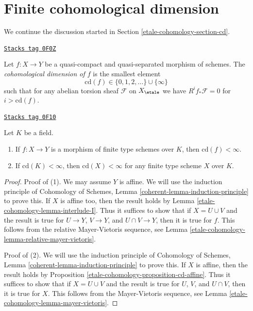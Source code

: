 \section{Finite cohomological dimension}
\label{etale-cohomology-section-finite-cd}
We continue the discussion started in Section \ref{etale-cohomology-section-cd}.

\begin{definition}[Cd f]
\label{etale-cohomology-definition-cd-f}
\href{https://stacks.math.columbia.edu/tag/0F0Z}{\texttt{Stacks tag 0F0Z}}

Let $f : X \to Y$ be a quasi-compact and quasi-separated
morphism of schemes.
The {\it cohomological dimension of $f$} is the smallest
element
$$
\text{cd}(f) \in \{0, 1, 2, \ldots\} \cup \{\infty\}
$$
such that for any abelian torsion sheaf $\mathcal{F}$
on $X_\etale$ we have $R^if_*\mathcal{F} = 0$
for $i > \text{cd}(f)$.
\end{definition}

\begin{lemma}[Finite cd]
\label{etale-cohomology-lemma-finite-cd}
\href{https://stacks.math.columbia.edu/tag/0F10}{\texttt{Stacks tag 0F10}}

Let $K$ be a field.
\begin{enumerate}
\item If $f : X \to Y$ is a morphism of finite type schemes over $K$,
then $\text{cd}(f) < \infty$.
\item If $\text{cd}(K) < \infty$, then $\text{cd}(X) < \infty$
for any finite type scheme $X$ over $K$.
\end{enumerate}
\end{lemma}

\begin{proof}
Proof of (1). We may assume $Y$ is affine. We will use the
induction principle of
Cohomology of Schemes, Lemma \ref{coherent-lemma-induction-principle}
to prove this. If $X$ is affine too, then the result holds by
Lemma \ref{etale-cohomology-lemma-interlude-I}. Thus it suffices to show that if
$X = U \cup V$ and the result is true for $U \to Y$, $V \to Y$, and
$U \cap V \to Y$, then it is true for $f$. This follows from the
relative Mayer-Vietoris sequence, see
Lemma \ref{etale-cohomology-lemma-relative-mayer-vietoris}.

\medskip\noindent
Proof of (2). We will use the induction principle of
Cohomology of Schemes, Lemma \ref{coherent-lemma-induction-principle}
to prove this. If $X$ is affine, then the result holds by
Proposition \ref{etale-cohomology-proposition-cd-affine}. Thus it suffices to show that if
$X = U \cup V$ and the result is true for $U$, $V$, and
$U \cap V $, then it is true for $X$. This follows from the
Mayer-Vietoris sequence, see
Lemma \ref{etale-cohomology-lemma-mayer-vietoris}.
\end{proof}

